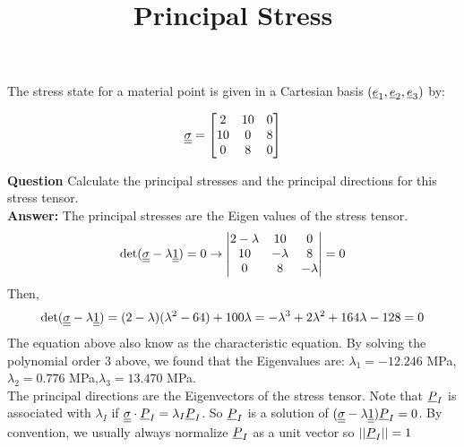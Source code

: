 \documentclass[letter,12pt]{article}
\begin{document}
\pagestyle{fancy}

\title{\textbf{Principal Stress}}
\date{}

\maketitle

\vspace{-1cm}


The stress state for a material point is given in a Cartesian basis $(\underline{e}_1,\underline{e}_2,\underline{e}_3)$ by:

\begin{equation}
\underline{\underline{\sigma}} = 
\begin{bmatrix}
2  & 10 & 0  \\
10 & 0  & 8  \\
0  & 8  & 0
\end{bmatrix}
\end{equation}

\noindent \textbf{Question} Calculate the principal stresses and the principal directions for this stress tensor. \\

\textbf{Answer:} The principal stresses are the Eigen values of the stress tensor.
\begin{equation}
\det (\underline{\underline{\sigma}} - \lambda \underline{\underline{1}}) = 0 \rightarrow \left|  \begin{matrix}
2 - \lambda & 10 & 0 \\
10  & -\lambda & 8 \\
0 & 8 & -\lambda
\end{matrix}\right| = 0
\end{equation}
Then,
\begin{equation}
\det (\underline{\underline{\sigma}} - \lambda \underline{\underline{1}}) = (2-\lambda)(\lambda^2 - 64)+100\lambda = -\lambda^3 + 2\lambda^2 +164 \lambda -128 = 0
\end{equation}
The equation above also know as the characteristic equation. By solving the polynomial order 3 above, we found that the Eigenvalues are: $\lambda_1 = -12.246$ MPa,$ \lambda_2 = 0.776$ MPa,$\lambda_3 = 13.470$ MPa. \\

The principal directions are the Eigenvectors of the stress tensor. Note that $\underline{P}_I$ is associated with $\lambda_I$ if $\underline{\underline{\sigma}} \cdot \underline{P}_I = \lambda_I \underline{P}_I$. So $\underline{P}_I$ is a solution of $(\underline{\underline{\sigma}} - \lambda \underline{\underline{1}}) \underline{P}_I = 0 $. By convention, we usually always normalize $\underline{P}_I$ as a unit vector so $||\underline{P}_I||=1$





	 



 
\end{document}
